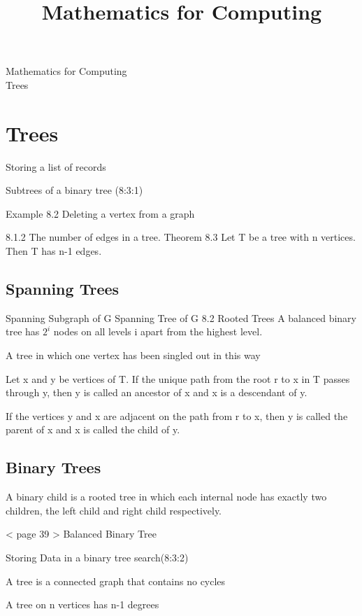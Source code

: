 \documentclass[12pt]{article}
\title{Mathematics for Computing}
\begin{document}
\begin{center}
\huge{Mathematics for Computing}\\
\LARGE{Trees}
\end{center}

\section{Trees}

Storing a list of records

Subtrees of a binary tree (8:3:1)


Example 8.2 Deleting a vertex from a graph

8.1.2 The number of edges in a tree.
Theorem 8.3 Let T be a tree with n vertices. Then T has n-1 edges.
\subsection*{Spanning Trees}
Spanning Subgraph of G
Spanning Tree of G
8.2 Rooted Trees
A balanced binary tree has $2^i$ nodes on all levels i apart from the highest level.

A tree in which one vertex has been singled out in this way

Let x and y be vertices of T. If the unique path from the root r
to x in T passes through y, then y is called an ancestor of x and x is a 
descendant of y.

If the vertices y and x are adjacent on the path from r to x, then
y is called the parent of x and x is called the child of y.


\subsection{Binary Trees}
A binary child is a rooted tree in which each internal node has exactly
two children, the left child and right child respectively.

< page 39 >
Balanced Binary Tree

Storing Data in a binary tree search(8:3:2)

A tree is a connected graph that contains no cycles

A tree on n vertices has n-1 degrees
\end{document}

